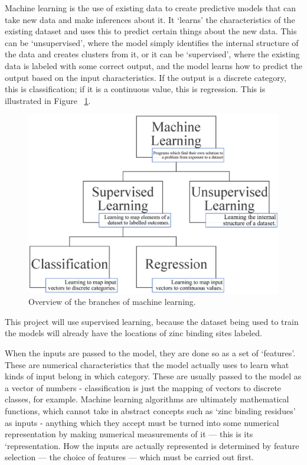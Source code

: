 Machine learning is the use of existing data to create predictive models that can take new data and make inferences about it. It `learns' the characteristics of the existing dataset and uses this to predict certain things about the new data. This can be `unsupervised', where the model simply identifies the internal structure of the data and creates clusters from it, or it can be `supervised', where the existing data is labeled with some correct output, and the model learns how to predict the output based on the input characteristics. If the output is a discrete category, this is classification; if it is a continuous value, this is regression. This is illustrated in Figure ~\ref{fig:machine-learning}.

\begin{figure}
\centering
\includegraphics[width=1.0\textwidth]{Figures/machine-learning.eps}
\caption{\label{fig:machine-learning} Overview of the branches of machine learning.}
\end{figure}

This project will use supervised learning, because the dataset being used to train the models will already have the locations of zinc binding sites labeled. 


When the inputs are passed to the model, they are done so as a set of `features'. These are numerical characteristics that the model actually uses to learn what kinds of input belong in which category. These are usually passed to the model as a vector of numbers - classification is just the mapping of vectors to discrete classes, for example. Machine learning algorithms are ultimately mathematical functions, which cannot take in abstract concepts such as `zinc binding residues' as inputs - anything which they accept must be turned into some numerical representation by making numerical measurements of it --- this is its `representation. How the inputs are actually represented is determined by feature selection --- the choice of features --- which must be carried out first.

